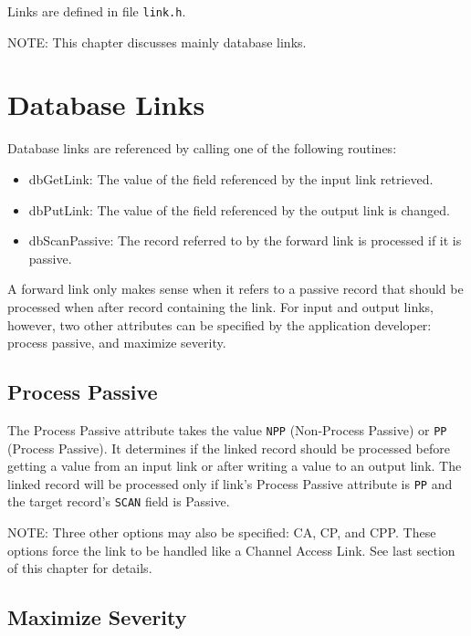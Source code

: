 Links are defined in file \verb|link.h|.

NOTE: This chapter discusses mainly database links.

\section{Database Links}

Database links are referenced by calling one of the following routines:

\begin{itemize}
\item {}dbGetLink: The value of the field referenced by the input link retrieved.

\item {}dbPutLink: The value of the field referenced by the output link is changed.

\item {}dbScanPassive: The record referred to by the forward link is processed if it is passive.

\end{itemize}

A forward link only makes sense when it refers to a passive record that should be processed when after record containing the link.
For input and output links, however, two other attributes can be specified by the application developer: process passive, and maximize severity.

\subsection{Process Passive}

The Process Passive attribute takes the value \verb|NPP| (Non-Process Passive) or \verb|PP| (Process Passive).
It determines if the linked record should be processed before getting a value from an input link or after writing a value to an output link.
The linked record will be processed only if link's Process Passive attribute is \verb|PP| and the target record's \verb|SCAN| field is Passive.

NOTE: Three other options may also be specified: CA, CP, and CPP. These options force the link to be handled like a Channel Access Link.
See last section of this chapter for details.

\subsection{Maximize Severity}

